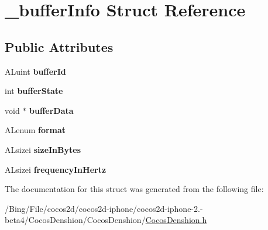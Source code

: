 \hypertarget{struct__buffer_info}{\section{\-\_\-buffer\-Info Struct Reference}
\label{struct__buffer_info}
}
\subsection*{Public Attributes}
\begin{DoxyCompactItemize}
\item 
\hypertarget{struct__buffer_info_ada9a4b0d226243291982b16fd0aa4320}{A\-Luint {\bfseries buffer\-Id}}\label{struct__buffer_info_ada9a4b0d226243291982b16fd0aa4320}

\item 
\hypertarget{struct__buffer_info_a7ec9ded79929d9a8d532e8847cffe18e}{int {\bfseries buffer\-State}}\label{struct__buffer_info_a7ec9ded79929d9a8d532e8847cffe18e}

\item 
\hypertarget{struct__buffer_info_a7d152df8d2289cd3ba5069ab26c5f3a0}{void $\ast$ {\bfseries buffer\-Data}}\label{struct__buffer_info_a7d152df8d2289cd3ba5069ab26c5f3a0}

\item 
\hypertarget{struct__buffer_info_ac74dea7e65809ec13a1d8fa2981bdffe}{A\-Lenum {\bfseries format}}\label{struct__buffer_info_ac74dea7e65809ec13a1d8fa2981bdffe}

\item 
\hypertarget{struct__buffer_info_a0ab48cabebb4e040758bbd751e2eaf1c}{A\-Lsizei {\bfseries size\-In\-Bytes}}\label{struct__buffer_info_a0ab48cabebb4e040758bbd751e2eaf1c}

\item 
\hypertarget{struct__buffer_info_add13810b4e5f1cde5ae260bcc427e9a6}{A\-Lsizei {\bfseries frequency\-In\-Hertz}}\label{struct__buffer_info_add13810b4e5f1cde5ae260bcc427e9a6}

\end{DoxyCompactItemize}


The documentation for this struct was generated from the following file\-:\begin{DoxyCompactItemize}
\item 
/\-Bing/\-File/cocos2d/cocos2d-\/iphone/cocos2d-\/iphone-\/2.-\/beta4/\-Cocos\-Denshion/\-Cocos\-Denshion/\hyperlink{_cocos_denshion_8h}{Cocos\-Denshion.\-h}\end{DoxyCompactItemize}

